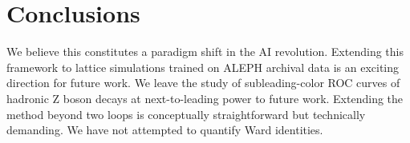 \section{Conclusions}\label{sec:conclusions}

We believe this constitutes a paradigm shift in the AI revolution.
Extending this framework to lattice simulations trained on ALEPH
archival data is an exciting direction for future work. We leave the
study of subleading-color ROC curves of hadronic Z boson decays at
next-to-leading power to future work. Extending the method beyond two
loops is conceptually straightforward but technically demanding. We have
not attempted to quantify Ward identities.

